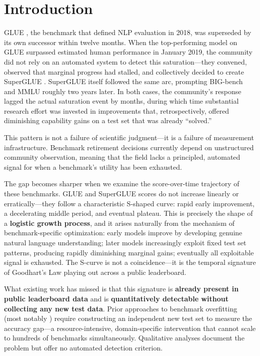 \section{Introduction}

GLUE \citep{wang2018glue}, the benchmark that defined NLP evaluation in 2018, was superseded by its own successor within twelve months.
When the top-performing model on GLUE surpassed estimated human performance in January 2019, the community did not rely on an automated system to detect this saturation---they convened, observed that marginal progress had stalled, and collectively decided to create SuperGLUE \citep{wang2019superglue}.
SuperGLUE itself followed the same arc, prompting BIG-bench \citep{srivastava2022bigbench} and MMLU \citep{hendrycks2021mmlu} roughly two years later.
In both cases, the community's response lagged the actual saturation event by months, during which time substantial research effort was invested in improvements that, retrospectively, offered diminishing capability gains on a test set that was already ``solved.''

This pattern is not a failure of scientific judgment---it is a failure of measurement infrastructure.
Benchmark retirement decisions currently depend on unstructured community observation, meaning that the field lacks a principled, automated signal for when a benchmark's utility has been exhausted.

The gap becomes sharper when we examine the score-over-time trajectory of these benchmarks.
GLUE and SuperGLUE scores do not increase linearly or erratically---they follow a characteristic S-shaped curve: rapid early improvement, a decelerating middle period, and eventual plateau.
This is precisely the shape of a \textbf{logistic growth process}, and it arises naturally from the mechanism of benchmark-specific optimization: early models improve by developing genuine natural language understanding; later models increasingly exploit fixed test set patterns, producing rapidly diminishing marginal gains; eventually all exploitable signal is exhausted.
The S-curve is not a coincidence---it is the temporal signature of Goodhart's Law \citep{goodhart1975problems} playing out across a public leaderboard.

What existing work has missed is that this signature is \textbf{already present in public leaderboard data} and is \textbf{quantitatively detectable without collecting any new test data}.
Prior approaches to benchmark overfitting (most notably \citealt{recht2019imagenet}) require constructing an independent new test set to measure the accuracy gap---a resource-intensive, domain-specific intervention that cannot scale to hundreds of benchmarks simultaneously.
Qualitative analyses \citep{bender2021stochastic} document the problem but offer no automated detection criterion.

